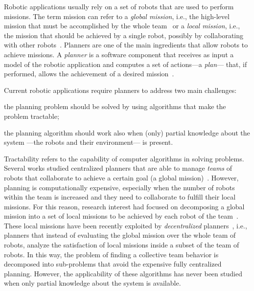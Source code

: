 Robotic applications usually rely on a set of robots that are used to perform missions.
The term mission can refer to a \emph{global mission}, i.e., the high-level mission that must be accomplished by the whole team~\cite{quottrup2004multi} or a \emph{local mission}, i.e., the mission that should be achieved by a single robot, possibly by collaborating with other robots~\cite{tumova2016multi}.
Planners are one of the main ingredients that allow robots to achieve  missions.
A \emph{planner} is  a software component that receives as input a model of the robotic application and computes  a set of actions---a \emph{plan}--- that, if performed, allows the achievement of a desired mission~\cite{latombe2012robot}.

Current robotic applications require planners to address two main challenges: 
\begin{enumerate*}
\item the planning problem should be solved by using algorithms that make the problem tractable;
\item the planning algorithm should work also when (only) partial knowledge about the system ---the robots and their environment--- is present.
\end{enumerate*}

Tractability refers to the capability of computer algorithms in solving problems. 
Several works studied centralized planners that are able to manage \emph{teams} of robots that collaborate to achieve a certain goal (a global mission)~\cite{kloetzer2011multi,loizou2005automated,quottrup2004multi}.
However, planning is computationally expensive, especially when the number of robots within the team is increased and they need to collaborate to fulfill their local missions.
For this reason, research interest had focused on decomposing a global mission into a set of local missions to be achieved by each robot of the team~\cite{schillinger2016decomposition,guo2015multi,guo2015multi,tumova2016multi}. 
These local missions have been recently exploited by \emph{decentralized} planners~\cite{tumova2016multi}, i.e., planners that instead of evaluating the global mission over the whole team of robots, analyze the satisfaction of local missions inside a subset of the team of robots. 
In this way, the problem of finding a collective team behavior is decomposed into sub-problems that avoid the expensive fully centralized planning. 
However, the applicability of these algorithms has never been studied when only partial knowledge about the system is available.


